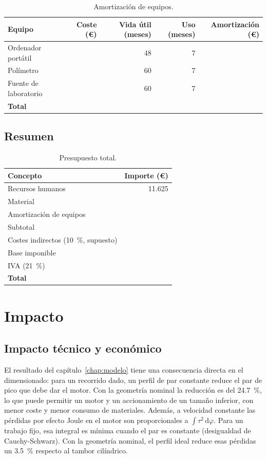 \begin{table}[H]
\centering
\caption{Amortización de equipos.}
\label{tab:amortizacion}
\begin{tabular}{@{}lrrrr@{}}
\toprule
Equipo & Coste (€) & Vida útil (meses) & Uso (meses) & Amortización (€) \\
\midrule
Ordenador portátil & \completar{} & 48 & 7 & \\
Polímetro & \completar{} & 60 & 7 & \\
Fuente de laboratorio & \completar{} & 60 & 7 & \\
\midrule
\textbf{Total} & & & & \completar{} \\
\bottomrule
\end{tabular}
\end{table}

\subsection{Resumen}

\begin{table}[H]
\centering
\caption{Presupuesto total.}
\label{tab:presupuesto}
\begin{tabular}{@{}lr@{}}
\toprule
Concepto & Importe (€) \\
\midrule
Recursos humanos & 11.625 \\
Material & \completar{} \\
Amortización de equipos & \completar{} \\
\midrule
Subtotal & \completar{} \\
Costes indirectos (\SI{10}{\percent}, supuesto) & \completar{} \\
\midrule
Base imponible & \completar{} \\
IVA (\SI{21}{\percent}) & \completar{} \\
\midrule
\textbf{Total} & \completar{} \\
\bottomrule
\end{tabular}
\end{table}

\section{Impacto}

\subsection{Impacto técnico y económico}

El resultado del capítulo~\ref{chap:modelo} tiene una consecuencia directa en el dimensionado:
para un recorrido dado, un perfil de par constante reduce el par de pico que debe dar el motor. Con
la geometría nominal la reducción es del \SI{24.7}{\percent}, lo que puede permitir un motor y un
accionamiento de un tamaño inferior, con menor coste y menor consumo de materiales. Además, a
velocidad constante las pérdidas por efecto Joule en el motor son proporcionales a
$\int\tau^2\,\mathrm{d}\varphi$. Para un trabajo fijo, esa integral es mínima cuando el par es
constante (desigualdad de Cauchy-Schwarz). Con la geometría nominal, el perfil ideal reduce esas
pérdidas un \SI{3.5}{\percent} respecto al tambor cilíndrico.

